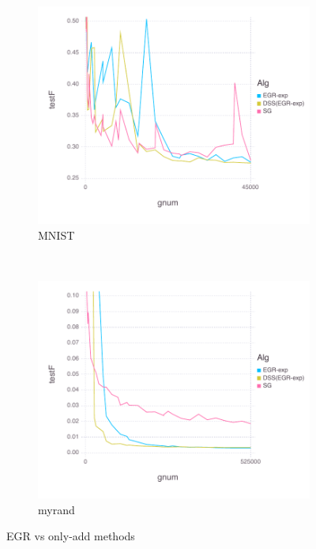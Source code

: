 \documentclass[11pt]{article}
\begin{document}
   \begin{figure}[H]
       \centering
       \begin{subfigure}[b]{0.45\textwidth}
           \includegraphics[width=\textwidth]{Figures/MNISTBLtrueFfFinal-dss.pdf}
           \caption{MNIST}
       \end{subfigure}
       ~ %
         \begin{subfigure}[b]{0.45\textwidth}
           \includegraphics[width=\textwidth]{Figures/myrandBLtrueFfFinal-dss.pdf}
             \caption{myrand}
         \end{subfigure}
       \caption{EGR vs only-add methods}\label{fig:MNISToa}
   \end{figure}
   
\end{document}
